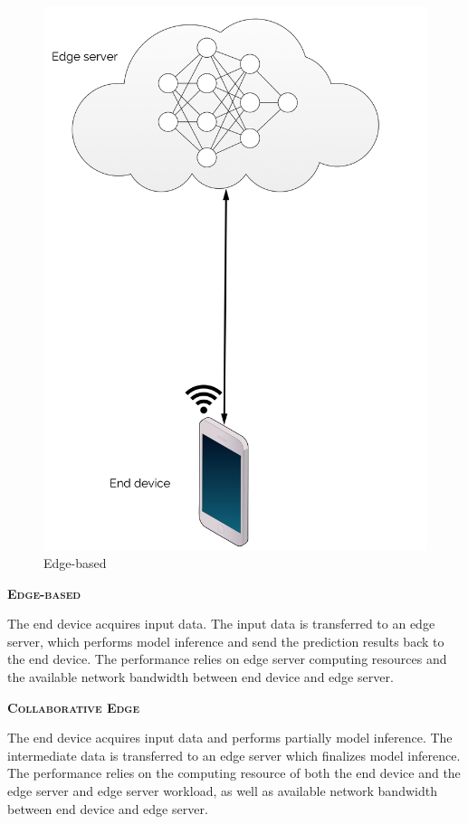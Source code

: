 \begin{minipage}{0.3\linewidth}
	\centering
	\begin{figure}
		\centering
		\includegraphics[width=\linewidth]{figures/models/edge}
		\caption[Edge-based]{Edge-based}
	\end{figure}
\end{minipage}
\hfill
\begin{minipage}{0.65\linewidth}
	\textbf{\textsc{Edge-based}}
	
	The end device acquires input data. The input data is transferred to an edge server, which performs model inference and send the prediction results back to the end device. The performance relies on edge server computing resources and the available network bandwidth between end device and edge server. 
\end{minipage}
\begin{minipage}{0.65\linewidth}
	\textbf{\textsc{Collaborative Edge}}
	
	The end device acquires input data and performs partially model inference. The intermediate data is transferred to an edge server which finalizes model inference. The performance relies on the computing resource of both the end device and the edge server and edge server workload, as well as available network bandwidth between end device and edge server. 
\end{minipage}%
